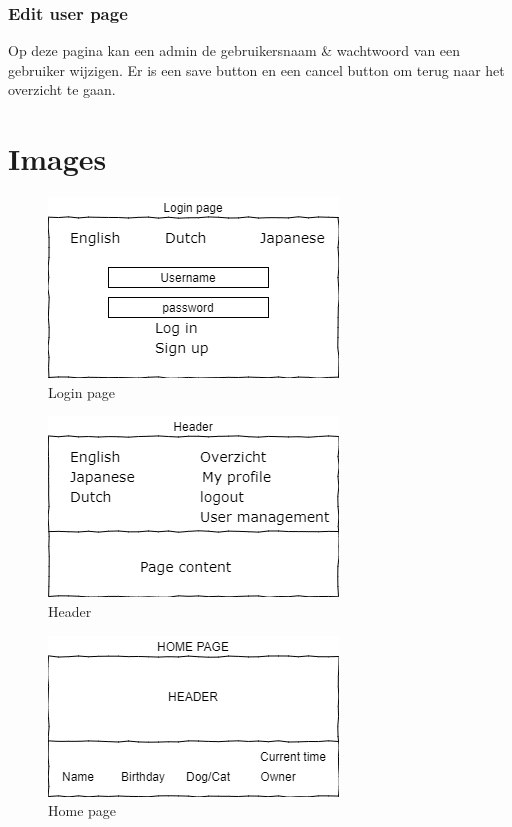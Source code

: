 \documentclass{article}
\begin{document}
\subsubsection{Edit user page}
Op deze pagina kan een admin de gebruikersnaam \& wachtwoord van een gebruiker wijzigen. Er is een save button en een cancel button om terug naar het overzicht te gaan.



\pagebreak

\section{Images}

\begin{figure}[!h]
    \centering
    \includegraphics{login_page}
    \caption{Login page}
    \label{fig:login page}
\end{figure}

\begin{figure}[!h]
    \centering
    \includegraphics{Header}
    \caption{Header}
    \label{fig:header}
\end{figure}

\begin{figure}[!h]
    \centering
    \includegraphics{home_page}
    \caption{Home page}
    \label{fig:home page}
\end{figure}
\end{document}
